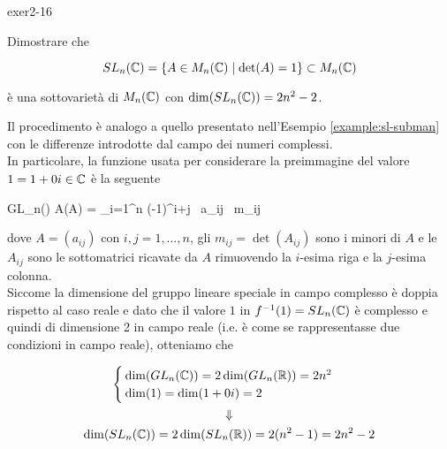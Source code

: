 {exer2-16}
{
Dimostrare che

\begin{equation}
	SL_{n}(\mathbb{C}) = \{ A \in M_{n}(\mathbb{C}) \mid \det(A) = 1 \} \subset M_{n}(\mathbb{C})
\end{equation}

è una sottovarietà di $ M_{n}(\mathbb{C}) $ con $ \dim(SL_{n}(\mathbb{C})) = 2 n^{2} - 2 $.
}
{
Il procedimento è analogo a quello presentato nell'Esempio \ref{example:sl-subman} con le differenze introdotte dal campo dei numeri complessi. \\
In particolare, la funzione usata per considerare la preimmagine del valore $ 1 = 1 + 0 i \in \mathbb{C} $ è la seguente

	{GL_{n}(\C)}{\C}
	{A}{\det(A) = \sum_{i=1}^{n} (-1)^{i+j} \, a_{ij} \, m_{ij}}

dove $ A = (a_{ij}) $ con $ i,j=1,\dots,n $, gli $ m_{ij} = \det(A_{ij}) $ sono i minori di $ A $ e le $ A_{ij} $ sono le sottomatrici ricavate da $ A $ rimuovendo la $ i $-esima riga e la $ j $-esima colonna. \\
Siccome la dimensione del gruppo lineare speciale in campo complesso è doppia rispetto al caso reale e dato che il valore $ 1 $ in $ f^{-1}(1) = SL_{n}(\mathbb{C}) $ è complesso e quindi di dimensione 2 in campo reale (i.e. è come se rappresentasse due condizioni in campo reale), otteniamo che

\begin{gather}
	\begin{cases}
		\dim(GL_{n}(\C)) = 2 \dim(GL_{n}(\R)) = 2 n^{2} \\
		\dim(1) = \dim(1 + 0 i) = 2
	\end{cases} \nonumber \\
	\Downarrow \\ %
	\dim(SL_{n}(\C)) = 2 \dim(SL_{n}(\R)) = 2(n^{2} - 1) = 2 n^{2} - 2 \nonumber
\end{gather}
}


